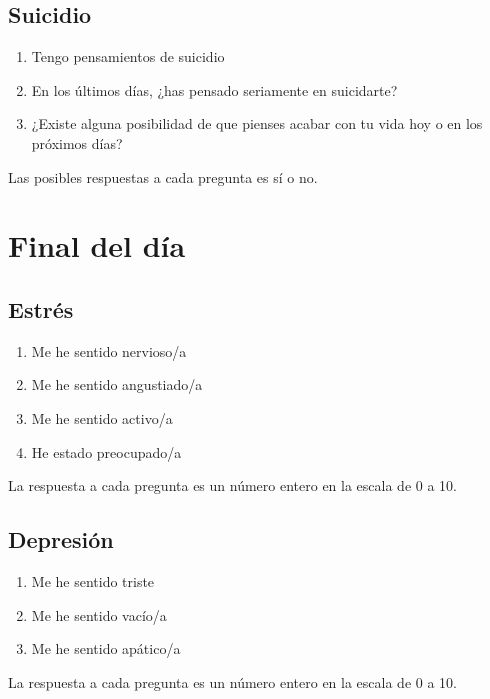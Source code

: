         \subsection{Suicidio}
            \label{cuestionarios:suicidio_manana}
            \begin{enumerate}
                \item Tengo pensamientos de suicidio
                \item En los últimos días, ¿has pensado seriamente en suicidarte?
                \item ¿Existe alguna posibilidad de que pienses acabar con tu vida hoy o en los próximos días?
            \end{enumerate}
            Las posibles respuestas a cada pregunta es sí o no.

    \section{Final del día}
        \subsection{Estrés}
            \label{cuestionarios:estres_noche}
            \begin{enumerate}
                \item Me he sentido nervioso/a
                \item Me he sentido angustiado/a
                \item Me he sentido activo/a
                \item He estado preocupado/a
            \end{enumerate}
            La respuesta a cada pregunta es un número entero en la escala de 0 a 10.

        \subsection{Depresión}
            \label{cuestionarios:depresion_noche}
            \begin{enumerate}
                \item Me he sentido triste
                \item Me he sentido vacío/a 
                \item Me he sentido apático/a
            \end{enumerate}
            La respuesta a cada pregunta es un número entero en la escala de 0 a 10.

